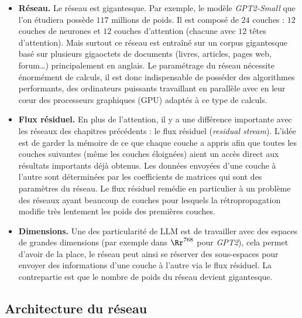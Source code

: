 \documentclass[11pt,class=report,crop=false]{standalone}
\begin{document}
\begin{itemize}
	\item \textbf{Réseau.}
	Le réseau est gigantesque. Par exemple, le modèle \emph{GPT2-Small} que l'on étudiera possède $117$ millions de poids. Il est composé de $24$ couches : $12$ couches de neurones et $12$ couches d'attention (chacune avec $12$ têtes d'attention). Mais surtout ce réseau est entraîné sur un corpus gigantesque basé sur plusieurs gigaoctets de documents (livres, articles, pages web, forum\ldots) principalement en anglais. 
	Le paramétrage du réseau nécessite énormément de calculs, il est donc indispensable de posséder des algorithmes performants, des ordinateurs puissants travaillant en parallèle avec en leur c\oe ur des processeurs graphiques (GPU) adaptés à ce type de calculs.
	
	\item \textbf{Flux résiduel.}
	En plus de l'attention, il y a une différence importante avec les réseaux des chapitres précédents : le flux résiduel (\emph{residual stream}). L'idée est de garder la mémoire de ce que chaque couche a appris afin que toutes les couches suivantes (même les couches éloignées) aient un accès direct aux résultats importants déjà obtenus. Les données envoyées d'une couche à l'autre sont déterminées par les coefficients de matrices qui sont des paramètres du réseau.
	Le flux résiduel remédie en particulier à un problème des réseaux ayant beaucoup de couches pour lesquels la rétropropagation modifie très lentement les poids des premières couches.
	
	\item \textbf{Dimensions.}
	Une des particularité de LLM est de travailler avec des espaces de grandes dimensions (par exemple dans $\Rr^{768}$ pour \emph{GPT2}), cela permet d'avoir \og{}de la place\fg{}, le réseau peut ainsi se réserver des sous-espaces pour envoyer des informations d'une couche à l'autre via le flux résiduel. La contrepartie est que le nombre de poids du réseau devient gigantesque.
	
	
\end{itemize}

	

\subsection{Architecture du réseau}
\end{document}
